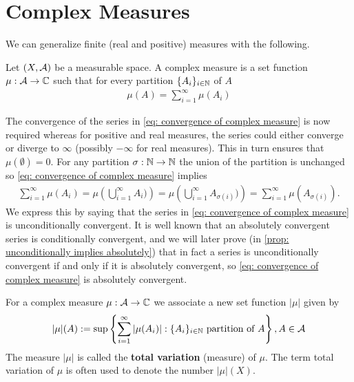 \documentclass[../../main.tex]{subfiles}
\begin{document}
\section{Complex Measures}

We can generalize finite (real and positive) measures with the following.

\begin{definition}
Let $(X, \mathcal{A})$ be a measurable space. A complex measure is a set function $\mu: \mathcal{A} \to \mathbb{C}$ such that for every partition $\{A_{i}\}_{i\in \mathbb{N}}$ of $A$
\begin{align}
	\mu(A) = \sum_{i=1}^{\infty}\mu(A_{i}) \label{eq: convergence of complex measure}
\end{align}
\end{definition}
The convergence of the series in \eqref{eq: convergence of complex measure} is now required whereas for positive and real measures, the series could either converge or diverge to $\infty$ (possibly $-\infty$ for real measures). This in turn ensures that $\mu(\emptyset)=0$.
For any partition $\sigma: \mathbb{N} \to \mathbb{N}$ the union of the partition is unchanged so \eqref{eq: convergence of complex measure} implies
\begin{align*}
	\sum_{i=1}^{\infty}\mu(A_{i}) = \mu\left(\bigcup_{i=1}^{\infty}A_{i})\right) = \mu\left(\bigcup_{i=1}^{\infty}A_{\sigma(i)})\right) = \sum_{i=1}^{\infty}\mu(A_{\sigma(i)}).
\end{align*}
We express this by saying that the series in \eqref{eq: convergence of complex measure} is unconditionally convergent. It is well known that an absolutely convergent series is conditionally convergent, and we will later prove (in \cref{prop: unconditionally implies absolutely}) that in fact a series is unconditionally convergent if and only if it is absolutely convergent, so \eqref{eq: convergence of complex measure} is absolutely convergent.

\begin{definition}
For a complex measure $\mu: \mathcal{A} \to \mathbb{C}$ we associate a new set function $|\mu|$ given by
\begin{align*}
	|\mu|(A) := \sup\left\{ \sum_{i=1}^{\infty} |\mu(A_{i}) | : \{A_{i}\}_{i\in \mathbb{N}} \text{ partition of } A \right\}, A \in \mathcal{A}
\end{align*}
The measure $|\mu|$ is called the \textbf{total variation} (measure) of $\mu$. The term total variation of $\mu$ is often used to denote the number $|\mu|(X)$.
\end{definition}
\end{document}
